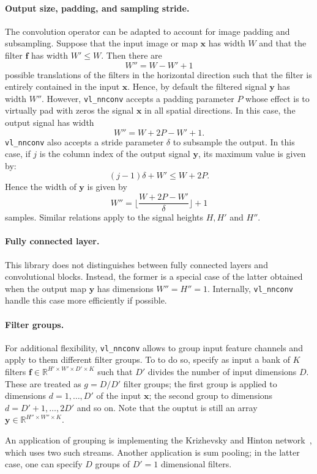 \documentclass[12pt]{article}
\newcommand{\real}{\mathbb{R}}
\newcommand{\bx}{\mathbf{x}}
\newcommand{\by}{\mathbf{y}}
\newcommand{\bff}{\mathbf{f}}
\begin{document}
\paragraph{Output size, padding, and sampling stride.} The convolution operator can be adapted to account for image padding and subsampling. Suppose that the input image or map $\bx$ has width $W$ and that the filter $\bff$ has width $W' \leq W$. Then there are 
\[
  W'' = W - W' + 1
\]
possible translations of the filters in the horizontal direction such that the filter is entirely contained in the input $\bx$. Hence, by default the filtered signal $\by$ has width $W''$. However, \verb!vl_nnconv! accepts a padding parameter $P$ whose effect is to virtually pad with zeros the signal $\bx$ in all spatial directions. In this case, the output signal has width
\[
  W'' = W + 2P - W' + 1.
\]
\verb!vl_nnconv! also accepts a stride parameter $\delta$ to subsample the output. In this case, if $j$ is the column index of the output signal $\by$, its maximum value is given by:
\[
(j-1)\delta + W' \leq W + 2P.
\]
Hence the width of $\by$ is given by
\[
W'' = \lfloor
\frac{W + 2P - W'}{\delta}
\rfloor + 1
\]
samples. Similar relations apply to the signal heights $H,H'$ and $H''$.

\paragraph{Fully connected layer.} This library does not distinguishes between fully connected layers and convolutional blocks. Instead, the former is a special case of the latter obtained when the output map $\by$ has dimensions $W''=H''=1$. Internally, \verb!vl_nnconv! handle this case more efficiently if possible.

\paragraph{Filter groups.} For additional flexibility, \verb!vl_nnconv! allows to group input feature channels and apply to them different filter groups. To to do so, specify as input a bank  of $K$ filters $\bff\in\real^{H'\times W'\times D'\times K}$ such that $D'$ divides the number of input dimensions $D$. These are treated as $g=D/D'$ filter groups; the first group is applied to dimensions $d=1,\dots,D'$ of the input $\bx$; the second group to dimensions $d=D'+1,\dots,2D'$ and so on. Note that the ouptut is still an array $\by\in\real^{H''\times W''\times K}$.

An application of grouping is implementing the Krizhevsky and Hinton network~\cite{krizhevsky12imagenet}, which uses two such streams. Another application is sum pooling; in the latter case, one can specify $D$ groups of $D'=1$ dimensional filters.
\end{document}
